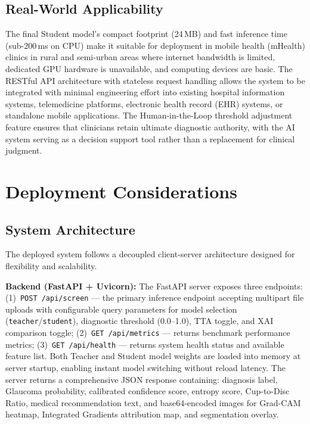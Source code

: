 \documentclass[conference]{IEEEtran}
\begin{document}
\subsection{Real-World Applicability}
The final Student model's compact footprint (24\,MB) and fast inference time (sub-200\,ms on CPU) make it suitable for deployment in mobile health (mHealth) clinics in rural and semi-urban areas where internet bandwidth is limited, dedicated GPU hardware is unavailable, and computing devices are basic. The RESTful API architecture with stateless request handling allows the system to be integrated with minimal engineering effort into existing hospital information systems, telemedicine platforms, electronic health record (EHR) systems, or standalone mobile applications. The Human-in-the-Loop threshold adjustment feature ensures that clinicians retain ultimate diagnostic authority, with the AI system serving as a decision support tool rather than a replacement for clinical judgment.

\section{Deployment Considerations}

\subsection{System Architecture}
The deployed system follows a decoupled client-server architecture designed for flexibility and scalability.

\textbf{Backend (FastAPI + Uvicorn):} The FastAPI server exposes three endpoints: (1)~\texttt{POST /api/screen} --- the primary inference endpoint accepting multipart file uploads with configurable query parameters for model selection (\texttt{teacher}/\texttt{student}), diagnostic threshold (0.0--1.0), TTA toggle, and XAI comparison toggle; (2)~\texttt{GET /api/metrics} --- returns benchmark performance metrics; (3)~\texttt{GET /api/health} --- returns system health status and available feature list. Both Teacher and Student model weights are loaded into memory at server startup, enabling instant model switching without reload latency. The server returns a comprehensive JSON response containing: diagnosis label, Glaucoma probability, calibrated confidence score, entropy score, Cup-to-Disc Ratio, medical recommendation text, and base64-encoded images for Grad-CAM heatmap, Integrated Gradients attribution map, and segmentation overlay.
\end{document}
